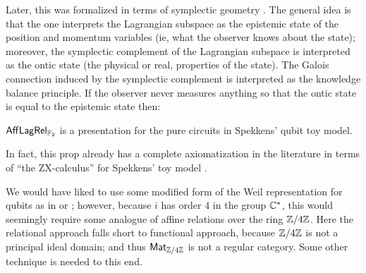 Later, this was formalized in terms of symplectic geometry \cite{spekkens2016quasi}. %
 The general idea is that the one interprets the Lagrangian subspace as the epistemic state of the position and momentum variables (ie, what the observer knows about the state); moreover, the symplectic complement of the Lagrangian subspace is interpreted as the ontic state (the physical or real, properties of the state).  The Galois connection induced by the symplectic complement is interpreted as the knowledge balance principle.  If the observer never measures anything so that the ontic state is equal to the epistemic state then:
\begin{corollary}
$\mathsf{Aff}\mathsf{Lag}\mathsf{Rel}_{\mathbb{F}_2}$ is a presentation for the pure circuits in Spekkens' qubit toy model.
\end{corollary}
In fact, this prop  already has a complete axiomatization in the literature in terms of ``the ZX-calculus'' for Spekkens' toy model \cite{backensspek}. %

We would have liked to use some modified form of the Weil representation for qubits as in \cite[\S 3.3]{heinrich2021stabiliser} or \cite{niel}; however, because $i$ has order $4$ in the group $\mathbb{C}^*$, this would seemingly require some analogue of affine relations over the ring $\mathbb{Z}/4\mathbb{Z}$.   Here the relational approach falls short to functional approach, because ${\mathbb{Z}/4\mathbb{Z}}$  is not a principal ideal domain; and thus  $\mathsf{Mat}_{\mathbb{Z}/4\mathbb{Z}}$  is not a regular category.  Some other technique is needed to this end.



